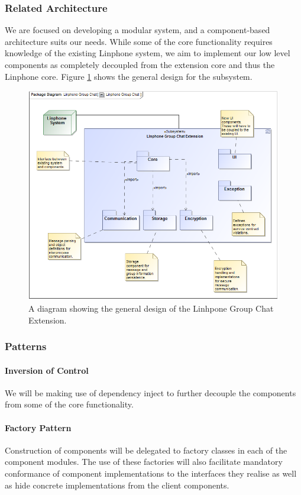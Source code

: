 \documentclass[11pt]{article}
\begin{document}
\subsubsection{Related Architecture}
We are focused on developing a modular system, and a component-based architecture suits our needs. While some of the core functionality requires knowledge of the existing Linphone system, we aim to implement our low level components as completely decoupled from the extension core and thus the Linphone core. Figure \ref{figure-architecture} shows the general design for the subsystem.
\begin{figure}[H]
\centering
\includegraphics[width=5in]{./images/architecture.png}
\caption[Architecture UML]{A diagram showing the general design of the Linhpone Group Chat Extension.}
\label{figure-architecture}
\end{figure}

\subsubsection{Patterns}
\paragraph{Inversion of Control}
We will be making use of dependency inject to further decouple the components from some of the core functionality. 
\paragraph{Factory Pattern}
Construction of components will be delegated to factory classes in each of the component modules. The use of these factories will also facilitate mandatory conformance of component implementations to the interfaces they realise as well as hide concrete implementations from the client components.
\end{document}
